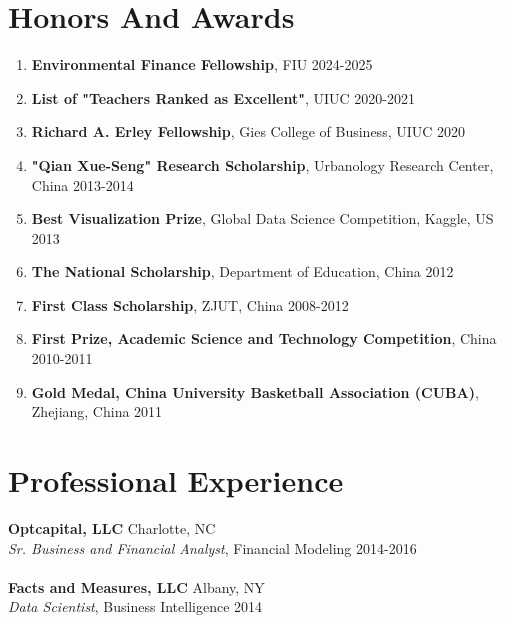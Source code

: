 \documentclass[margin,line]{resume}
\begin{document}
\begin{resume}
 	  \section{\mysidestyle Honors And Awards} 
 	  \begin{enumerate}[topsep=0pt, leftmargin=*]
    \item \textbf{Environmental Finance Fellowship}, FIU \hfill 2024-2025
 	     \item \textbf{List of "Teachers Ranked as Excellent"}, UIUC \hfill 2020-2021
 	     \item \textbf{Richard A. Erley Fellowship}, Gies College of Business, UIUC \hfill 2020
 	     \item \textbf{"Qian Xue-Seng" Research Scholarship}, Urbanology Research Center, China \hfill 2013-2014
 	     \item \textbf{Best Visualization Prize}, Global Data Science Competition, Kaggle, US  \hfill 2013
 	     \item \textbf{The National Scholarship}, Department of Education, China \hfill 2012
 	     \item \textbf{First Class Scholarship}, ZJUT, China \hfill  2008-2012
 	     \item \textbf{First Prize, Academic Science and Technology Competition}, China \hfill 2010-2011
 	     \item \textbf{Gold Medal, China University Basketball Association (CUBA)}, Zhejiang, China \hfill 2011
 	  \end{enumerate}
    \newpage
 	  \section{\mysidestyle Professional Experience} 
         \textbf{Optcapital, LLC} \hfill Charlotte, NC\\
         {\sl Sr. Business and Financial Analyst}, Financial Modeling \hfill 2014-2016\\
         \\
         \textbf{Facts and Measures, LLC} \hfill Albany, NY\\
         {\sl Data Scientist}, Business Intelligence \hfill 2014


\end{resume}
\end{document}
